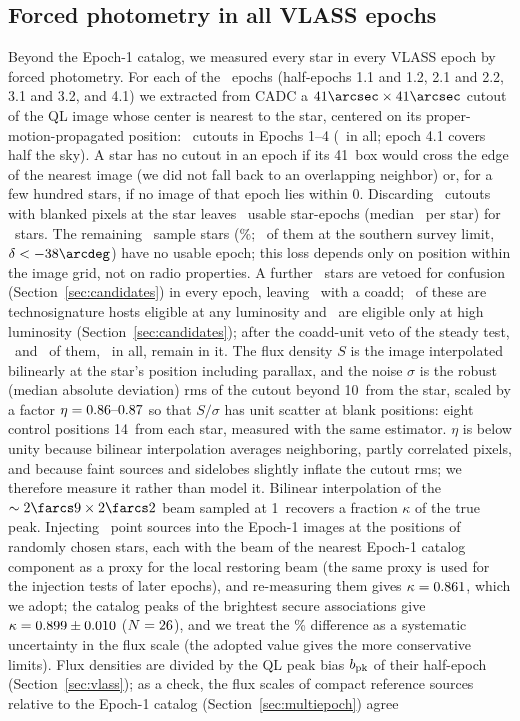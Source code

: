\documentclass[linenumbers]{aastex702}
\begin{document}
\subsection{Forced photometry in all VLASS epochs} \label{sec:forced}

Beyond the Epoch-1 catalog, we measured every star in every VLASS epoch by forced photometry. For each of the \NEpochTags\ epochs (half-epochs 1.1 and 1.2, 2.1 and 2.2, 3.1 and 3.2, and 4.1) we extracted from CADC a $41\arcsec\times41\arcsec$ cutout of the QL image whose center is nearest to the star, centered on its proper-motion-propagated position: \NCutEpList\ cutouts in Epochs 1--4 (\NCutoutsAll\ in all; epoch 4.1 covers half the sky). A star has no cutout in an epoch if its 41\arcsec\ box would cross the edge of the nearest image (we did not fall back to an overlapping neighbor) or, for a few hundred stars, if no image of that epoch lies within 0. Discarding \NBadCut\ cutouts with blanked pixels at the star leaves \NStarEpochs\ usable star-epochs (median \MedEpochs\ per star) for \NWithForced\ stars. The remaining \NNoEpoch\ sample stars (\NNoEpochPct\%; \NNoEpochSouth\ of them at the southern survey limit, $\delta<-38\arcdeg$) have no usable epoch; this loss depends only on position within the image grid, not on radio properties. A further \NAllVeto\ stars are vetoed for confusion (Section~\ref{sec:candidates}) in every epoch, leaving \NCoaddStars\ with a coadd; \NInactPhot\ of these are technosignature hosts eligible at any luminosity and \NEnvPhot\ are eligible only at high luminosity (Section~\ref{sec:candidates}); after the coadd-unit veto of the steady test, \NEligSteady\ and \NEnvSteady\ of them, \NAllFloor\ in all, remain in it. The flux density $S$ is the image interpolated bilinearly at the star's position including parallax, and the noise $\sigma$ is the robust (median absolute deviation) rms of the cutout beyond 10\arcsec\ from the star, scaled by a factor $\eta=\EtaRange$ so that $S/\sigma$ has unit scatter at blank positions: eight control positions 14\arcsec\ from each star, measured with the same estimator. $\eta$ is below unity because bilinear interpolation averages neighboring, partly correlated pixels, and because faint sources and sidelobes slightly inflate the cutout rms; we therefore measure it rather than model it. Bilinear interpolation of the $\sim2\farcs9\times2\farcs2$ beam sampled at 1\arcsec\ recovers a fraction $\kappa$ of the true peak. Injecting \NInject\ point sources into the Epoch-1 images at the positions of randomly chosen stars, each with the beam of the nearest Epoch-1 catalog component as a proxy for the local restoring beam (the same proxy is used for the injection tests of later epochs), and re-measuring them gives $\kappa=0.861$, which we adopt; the catalog peaks of the brightest secure associations give $\kappa=0.899\pm0.010$ ($N=26$), and we treat the \KappaSys\% difference as a systematic uncertainty in the flux scale (the adopted value gives the more conservative limits). Flux densities are divided by the QL peak bias $b_{\rm pk}$ of their half-epoch (Section~\ref{sec:vlass}); as a check, the flux scales of compact reference sources relative to the Epoch-1 catalog (Section~\ref{sec:multiepoch}) agree 
\end{document}
